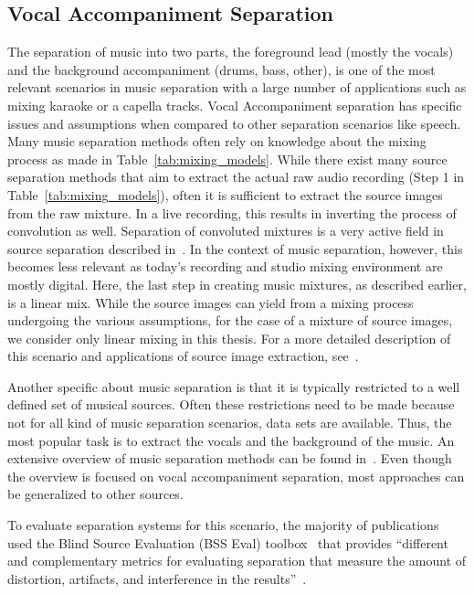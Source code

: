 \subsection{Vocal Accompaniment Separation}
The separation of music into two parts, the foreground lead (mostly the vocals) and the background accompaniment (drums, bass, other), is one of the most relevant scenarios in music separation with a large number of applications such as mixing karaoke or a capella tracks.
Vocal Accompaniment separation has specific issues and assumptions when compared to other separation scenarios like speech.
Many music separation methods often rely on knowledge about the mixing process as made in Table~\ref{tab:mixing_models}.
While there exist many source separation methods that aim to extract the actual raw audio recording (Step 1 in  Table~\ref{tab:mixing_models}), often it is sufficient to extract the source images from the raw mixture.
In a live recording, this results in inverting the process of convolution as well.
Separation of convoluted mixtures is a very active field in source separation described in~\cite{pedersen07}.
In the context of music separation, however, this becomes less relevant as today's recording and studio mixing environment are mostly digital.
Here, the last step in creating music mixtures, as described earlier, is a linear mix.
While the source images can yield from a mixing process undergoing the various assumptions, for the case of a mixture of source images, we consider only linear mixing in this thesis.
For a more detailed description of this scenario and applications of source image extraction, see~\cite{sturmel12}.
\par
Another specific about music separation is that it is typically restricted to a well defined set of musical sources.
Often these restrictions need to be made because not for all kind of music separation scenarios, data sets are available.
Thus, the most popular task is to extract the vocals and the background of the music.
An extensive overview of music separation methods can be found in~\cite{rafii18}.
Even though the overview is focused on vocal accompaniment separation, most approaches can be generalized to other sources.
\par
To evaluate separation systems for this scenario, the majority of publications used the Blind Source Evaluation (BSS Eval) toolbox~\cite{fevotte05,vincent06} that provides ``different and complementary metrics for evaluating separation that measure the amount of distortion, artifacts, and interference in the results''~\cite{rafii18}.

